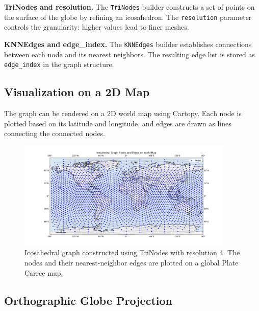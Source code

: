 %
{\bf TriNodes and resolution.}
The \texttt{TriNodes} builder constructs a set of points on the surface of the globe by refining an icosahedron. The \texttt{resolution} parameter controls the granularity: higher values lead to finer meshes.

{\bf KNNEdges and edge\_index.}
The \texttt{KNNEdges} builder establishes connections between each node and its nearest neighbors. The resulting edge list is stored as \texttt{edge\_index} in the graph structure.

%
\subsection{Visualization on a 2D Map}

The graph can be rendered on a 2D world map using Cartopy. Each node is plotted based on its latitude and longitude, and edges are drawn as lines connecting the connected nodes.

\begin{figure}[htbp]
    \centering
    \includegraphics[width=0.92\textwidth]{images/anemoi_graph_1.png}
    \caption{Icosahedral graph constructed using TriNodes with resolution 4. The nodes and their nearest-neighbor edges are plotted on a global Plate Carree map.}
    \label{fig:anemoi-graph-platecarree}
\end{figure}

%
\subsection{Orthographic Globe Projection}

